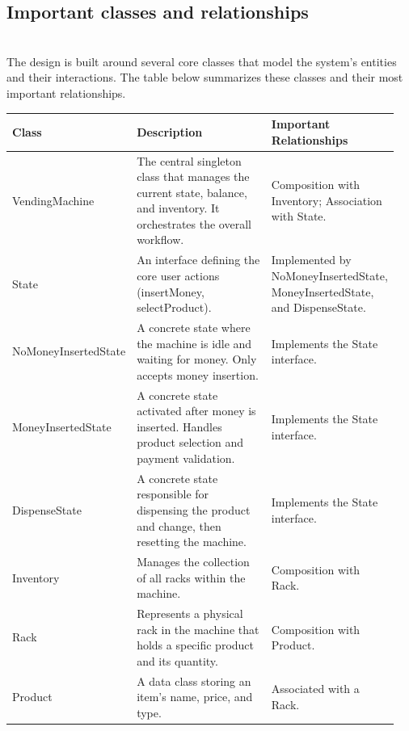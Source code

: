 \subsection{Important classes and relationships}\label{1ZDLEME3nNi2PRZ7bWtNR}
\\
The design is built around several core classes that model the system's entities and their interactions. The table below summarizes these classes and their most important relationships.

\begin{center}
\begin{tabular}{|p{0.20\linewidth}|p{0.45\linewidth}|p{0.30\linewidth}|}
\hline
\textbf{Class} & \textbf{Description} & \textbf{Important Relationships} \\
\hline
VendingMachine & 
The central singleton class that manages the current state, balance, and inventory. It orchestrates the overall workflow. &
Composition with Inventory; Association with State. \\
\hline

State &
An interface defining the core user actions (insertMoney, selectProduct). &
Implemented by NoMoneyInsertedState, MoneyInsertedState, and DispenseState. \\
\hline

NoMoneyInsertedState &
A concrete state where the machine is idle and waiting for money. Only accepts money insertion. &
Implements the State interface. \\
\hline

MoneyInsertedState &
A concrete state activated after money is inserted. Handles product selection and payment validation. &
Implements the State interface. \\
\hline

DispenseState &
A concrete state responsible for dispensing the product and change, then resetting the machine. &
Implements the State interface. \\
\hline

Inventory &
Manages the collection of all racks within the machine. &
Composition with Rack. \\
\hline

Rack &
Represents a physical rack in the machine that holds a specific product and its quantity. &
Composition with Product. \\
\hline

Product &
A data class storing an item's name, price, and type. &
Associated with a Rack. \\
\hline
\end{tabular}
\end{center}


